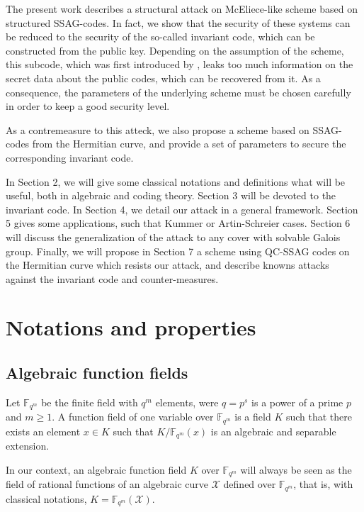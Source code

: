 \documentclass[10pt]{article}
\newcommand{\s}{\vspace{0.3cm}}
\newcommand{\fqm}{\mathbb{F}_{q^m}}
\newcommand{\X}{\mathcal{X}}
\begin{document}
\s

The present work describes a structural attack on McEliece-like scheme based on structured SSAG-codes. In fact, we show that the security of these systems can be reduced to the security of the so-called invariant code, which can be constructed from the public key. Depending on the assumption of the scheme, this subcode, which was first introduced by \cite{LOI}, leaks too much information on the secret data about the public codes, which can be recovered from it. As a consequence, the parameters of the underlying scheme must be chosen carefully in order to keep a good security level.

\s

As a contremeasure to this atteck, we also propose a scheme based on SSAG-codes from the Hermitian curve, and provide a set of parameters to secure the corresponding invariant code.

\s

In Section 2, we will give some classical notations and definitions what will be useful, both in algebraic and coding theory. Section 3 will be devoted to the invariant code. In Section 4, we detail our attack in a general framework. Section 5 gives some applications, such that Kummer or Artin-Schreier cases. Section 6 will discuss the generalization of the attack to any cover with solvable Galois group. Finally, we will propose in Section 7 a scheme using QC-SSAG codes on the Hermitian curve which resists our attack, and describe knowns attacks against the invariant code and counter-measures.


\s

\section{Notations and properties}

\s

\subsection{Algebraic function fields}

\s


Let $\fqm$ be the finite field with $q^m$ elements, were $q=p^s$ is a power of a prime $p$ and $m \geq 1$. A function field of one variable over $\fqm$ is a field $K$ such that there exists an element $x\in K$ such that $K/\fqm(x)$ is an algebraic and separable extension. 

In our context, an algebraic function field $K$ over $\fqm$ will always be seen as the field of rational functions of an algebraic curve $\X$ defined over $\fqm$, that is, with classical notations, $K = \fqm(\X)$.
\end{document}
